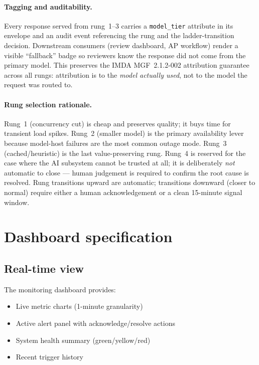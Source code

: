 \documentclass[11pt,a4paper,twoside]{report}
\begin{document}
\paragraph{Tagging and auditability.}
Every response served from rung~1--3 carries a \texttt{model\_tier}
attribute in its envelope and an audit event referencing the rung
and the ladder-transition decision. Downstream consumers (review
dashboard, AP workflow) render a visible ``fallback'' badge so
reviewers know the response did not come from the primary model.
This preserves the IMDA MGF~2.1.2-002 attribution guarantee across
all rungs: attribution is to the \emph{model actually used}, not
to the model the request was routed to.

\paragraph{Rung selection rationale.}
Rung~1 (concurrency cut) is cheap and preserves quality; it buys
time for transient load spikes. Rung~2 (smaller model) is the
primary availability lever because model-host failures are the
most common outage mode. Rung~3 (cached/heuristic) is the last
value-preserving rung. Rung~4 is reserved for the case where the
AI subsystem cannot be trusted at all; it is deliberately
\emph{not} automatic to close --- human judgement is required to
confirm the root cause is resolved. Rung transitions upward are
automatic; transitions downward (closer to normal) require either
a human acknowledgement or a clean 15-minute signal window.

\section{Dashboard specification}

\subsection{Real-time view}

The monitoring dashboard provides:

\begin{itemize}
\item Live metric charts (1-minute granularity)
\item Active alert panel with acknowledge/resolve actions
\item System health summary (green/yellow/red)
\item Recent trigger history
\end{itemize}
\end{document}
